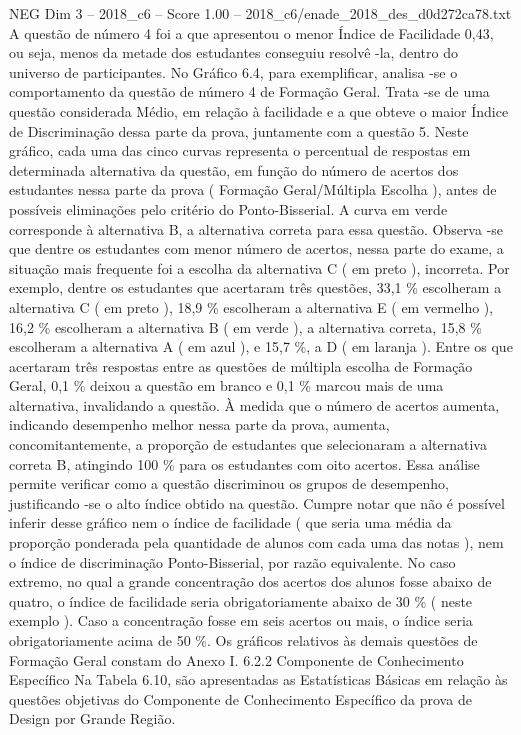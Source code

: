 \begin{textsample}{NEG Dim 3 – 2018\_c6 – Score 1.00 – 2018\_c6/enade\_2018\_des\_d0d272ca78.txt}
A questão de número 4 foi a que apresentou o menor Índice de Facilidade 0,43, ou seja, menos da metade dos estudantes conseguiu resolvê -la, dentro do universo de participantes.
No Gráfico 6.4, para exemplificar, analisa -se o comportamento da questão de número 4 de Formação Geral.
Trata -se de uma questão considerada Médio, em relação à facilidade e a que obteve o maior Índice de Discriminação dessa parte da prova, juntamente com a questão 5.
Neste gráfico, cada uma das cinco curvas representa o percentual de respostas em determinada alternativa da questão, em função do número de acertos dos estudantes nessa parte da prova ( Formação Geral/Múltipla Escolha ), antes de possíveis eliminações pelo critério do Ponto-Bisserial.
A curva em verde corresponde à alternativa B, a alternativa correta para essa questão.
Observa -se que dentre os estudantes com menor número de acertos, nessa parte do exame, a situação mais frequente foi a escolha da alternativa C ( em preto ), incorreta.
Por exemplo, dentre os estudantes que acertaram três questões, 33,1 \% escolheram a alternativa C ( em preto ), 18,9 \% escolheram a alternativa E ( em vermelho ), 16,2 \% escolheram a alternativa B ( em verde ), a alternativa correta, 15,8 \% escolheram a alternativa A ( em azul ), e 15,7 \%, a D ( em laranja ).
Entre os que acertaram três respostas entre as questões de múltipla escolha de Formação Geral, 0,1 \% deixou a questão em branco e 0,1 \% marcou mais de uma alternativa, invalidando a questão.
À medida que o número de acertos aumenta, indicando desempenho melhor nessa parte da prova, aumenta, concomitantemente, a proporção de estudantes que selecionaram a alternativa correta B, atingindo 100 \% para os estudantes com oito acertos.
Essa análise permite verificar como a questão discriminou os grupos de desempenho, justificando -se o alto índice obtido na questão.
Cumpre notar que não é possível inferir desse gráfico nem o índice de facilidade ( que seria uma média da proporção ponderada pela quantidade de alunos com cada uma das notas ), nem o índice de discriminação Ponto-Bisserial, por razão equivalente.
No caso extremo, no qual a grande concentração dos acertos dos alunos fosse abaixo de quatro, o índice de facilidade seria obrigatoriamente abaixo de 30 \% ( neste exemplo ).
Caso a concentração fosse em seis acertos ou mais, o índice seria obrigatoriamente acima de 50 \%.
Os gráficos relativos às demais questões de Formação Geral constam do Anexo I. 6.2.2 Componente de Conhecimento Específico Na Tabela 6.10, são apresentadas as Estatísticas Básicas em relação às questões objetivas do Componente de Conhecimento Específico da prova de Design por Grande Região.

\end{textsample}
